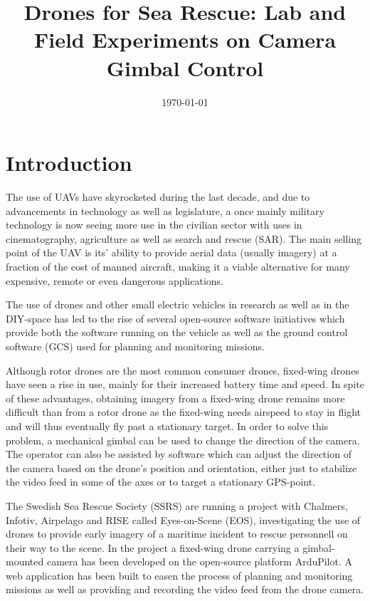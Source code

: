 \documentclass[nofilelist]{cslthse-msc}
\title{Drones for Sea Rescue: Lab and Field Experiments on Camera Gimbal Control}
\date{\today}
\begin{document}
\renewcommand{\bibname}{References}

\makefrontmatter
\chapter{Introduction}
The use of UAVs have skyrocketed during the last decade, and due to advancements in technology as well as legislature, a once mainly military technology is now seeing more use in the civilian sector with uses in cinematography, agriculture as well as search and rescue (SAR). The main selling point of the UAV is its' ability to provide aerial data (usually imagery) at a fraction of the cost of manned aircraft, making it a viable alternative for many expensive, remote or even dangerous applications.

The use of drones and other small electric vehicles in research as well as in the DIY-space has led to the rise of several open-source software initiatives which provide both the software running on the vehicle as well as the ground control software (GCS) used for planning and monitoring missions. 

Although rotor drones are the most common consumer drones, fixed-wing drones have seen a rise in use, mainly for their increased battery time and speed. In spite of these advantages, obtaining imagery from a fixed-wing drone remains more difficult than from a rotor drone as the fixed-wing needs airspeed to stay in flight and will thus eventually fly past a stationary target. In order to solve this problem, a mechanical gimbal can be used to change the direction of the camera. The operator can also be assisted by software which can adjust the direction of the camera based on the drone's position and orientation, either just to stabilize the video feed in some of the axes or to target a stationary GPS-point.

The Swedish Sea Rescue Society (SSRS) are running a project with Chalmers, Infotiv, Airpelago and RISE called Eyes-on-Scene (EOS), investigating the use of drones to provide early imagery of a maritime incident to rescue personnell on their way to the scene. In the project a fixed-wing drone carrying a gimbal-mounted camera has been developed on the open-source platform ArduPilot. A web application has been built to easen the process of planning and monitoring missions as well as providing and recording the video feed from the drone camera.
\end{document}
